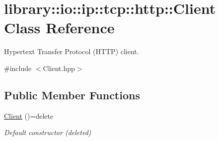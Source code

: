 \hypertarget{classlibrary_1_1io_1_1ip_1_1tcp_1_1http_1_1_client}{}\section{library\+:\+:io\+:\+:ip\+:\+:tcp\+:\+:http\+:\+:Client Class Reference}
\label{classlibrary_1_1io_1_1ip_1_1tcp_1_1http_1_1_client}


Hypertext Transfer Protocol (H\+T\+TP) client.  




{\ttfamily \#include $<$Client.\+hpp$>$}

\subsection*{Public Member Functions}
\begin{DoxyCompactItemize}
\item 
\hyperlink{classlibrary_1_1io_1_1ip_1_1tcp_1_1http_1_1_client_a15e8c6cbcc0ed6d37084f35371aa8ae0}{Client} ()=delete
\begin{DoxyCompactList}\small\item\em Default constructor (deleted) \end{DoxyCompactList}\end{DoxyCompactItemize}
